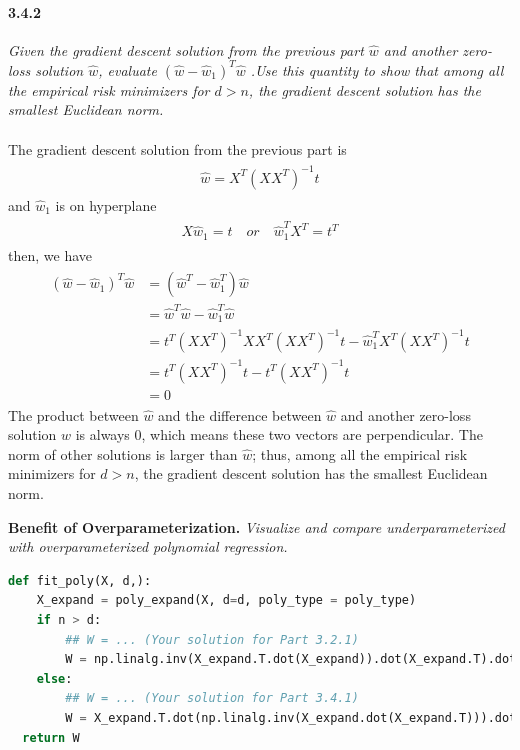 \documentclass{myhw}
\begin{document}
\begin{homeworkProblem}
\begin{homeworkSection}
\paragraph{3.4.2} \emph{Given the gradient descent solution from the previous part $\hat{w}$ and another zero-loss solution $\hat{w}$, evaluate $(\hat{w} - \hat{w}_1)^T\hat{w}$ .Use this quantity to show that among all the empirical risk minimizers for $d > n$, the gradient descent solution has the smallest Euclidean norm.} \\
\\
The gradient descent solution from the previous part is 
\begin{gather*}
\begin{aligned}
\hat{w} = X^T (XX^T)^{-1} t
\end{aligned}
\end{gather*}
and $\hat{w}_1$ is on hyperplane
\begin{gather*}
\begin{aligned}
X \hat{w}_1 = t \quad or \quad
\hat{w}_1^T X^T = t^T
\end{aligned}
\end{gather*}
then, we have
\begin{gather*}
\begin{aligned}
(\hat{w} - \hat{w}_1)^T \hat{w} &= (\hat{w}^T - \hat{w}_1^T) \hat{w} \\
&= \hat{w}^T\hat{w} - \hat{w}_1^T \hat{w} \\
&= t^T (XX^T)^{-1} X X^T (XX^T)^{-1} t - \hat{w}_1^T X^T (XX^T)^{-1} t \\
&= t^T (XX^T)^{-1} t - t^T (XX^T)^{-1} t \\
&= 0
\end{aligned}
\end{gather*}
The product between $\hat{w}$ and the difference between $\hat{w}$ and another zero-loss solution $\hat{w}$ is always 0, which means these two vectors are perpendicular. The norm of other solutions is larger than $\hat{w}$; thus, among all the empirical risk minimizers for $d > n$, the gradient descent solution has the smallest Euclidean norm.
\end{homeworkSection}
\begin{homeworkSection}
\textbf{Benefit of Overparameterization.} \emph{Visualize and compare underparameterized with overparameterized polynomial regression.}
\begin{lstlisting}[language = PYTHON, keywordstyle=\color{blue!100}, 
    commentstyle=\color{red!50!green!50!blue!50}, 
    rulesepcolor=\color{red!20!green!20!blue!20}, 
    basicstyle=\small\ttfamily,
    breaklines=true,]
def fit_poly(X, d,):
    X_expand = poly_expand(X, d=d, poly_type = poly_type)
    if n > d:
        ## W = ... (Your solution for Part 3.2.1)
        W = np.linalg.inv(X_expand.T.dot(X_expand)).dot(X_expand.T).dot(t)
    else:
        ## W = ... (Your solution for Part 3.4.1)
        W = X_expand.T.dot(np.linalg.inv(X_expand.dot(X_expand.T))).dot(t)
  return W
\end{lstlisting}
\end{homeworkSection}
\end{homeworkProblem}
\end{document}
